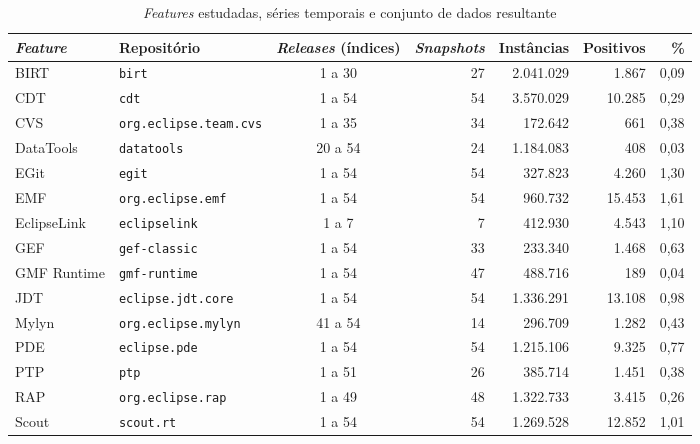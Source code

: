 \begin{table}[htbp]
    \centering
    \footnotesize
    \setlength{\tabcolsep}{5pt}%
    \caption{\textit{Features} estudadas, séries temporais e conjunto de dados resultante}
    \label{tab:met-features}
    \begin{tabular}{llcrrrr}
        \toprule
        \textit{Feature} & Repositório & \textit{Releases} (índices) & \textit{Snapshots} & Instâncias & Positivos & \% \\
        \midrule
        BIRT            & \texttt{birt}                 & 1 a 30  & 27 & 2.041.029 &  1.867 & 0,09 \\
        CDT             & \texttt{cdt}                  & 1 a 54  & 54 & 3.570.029 & 10.285 & 0,29 \\
        CVS             & \texttt{org.eclipse.team.cvs} & 1 a 35  & 34 &   172.642 &    661 & 0,38 \\
        DataTools       & \texttt{datatools}            & 20 a 54 & 24 & 1.184.083 &    408 & 0,03 \\
        EGit            & \texttt{egit}                 & 1 a 54  & 54 &   327.823 &  4.260 & 1,30 \\
        EMF             & \texttt{org.eclipse.emf}      & 1 a 54  & 54 &   960.732 & 15.453 & 1,61 \\
        EclipseLink     & \texttt{eclipselink}          & 1 a 7   &  7 &   412.930 &  4.543 & 1,10 \\
        GEF             & \texttt{gef-classic}          & 1 a 54  & 33 &   233.340 &  1.468 & 0,63 \\
        GMF Runtime     & \texttt{gmf-runtime}          & 1 a 54  & 47 &   488.716 &    189 & 0,04 \\
        JDT             & \texttt{eclipse.jdt.core}     & 1 a 54  & 54 & 1.336.291 & 13.108 & 0,98 \\
        Mylyn           & \texttt{org.eclipse.mylyn}    & 41 a 54 & 14 &   296.709 &  1.282 & 0,43 \\
        PDE             & \texttt{eclipse.pde}          & 1 a 54  & 54 & 1.215.106 &  9.325 & 0,77 \\
        PTP             & \texttt{ptp}                  & 1 a 51  & 26 &   385.714 &  1.451 & 0,38 \\
        RAP             & \texttt{org.eclipse.rap}      & 1 a 49  & 48 & 1.322.733 &  3.415 & 0,26 \\
        Scout           & \texttt{scout.rt}             & 1 a 54  & 54 & 1.269.528 & 12.852 & 1,01 \\

\end{tabular}
\end{table}
